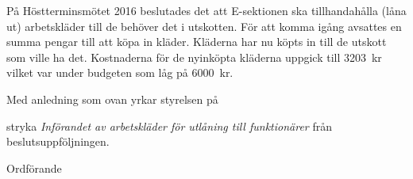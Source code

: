 \documentclass[../_main/handlingar.tex]{subfiles}
\begin{document}

På Höstterminsmötet 2016 beslutades det att E-sektionen ska tillhandahålla (låna ut) arbetskläder till de behöver det i utskotten. För att komma igång avsattes en summa pengar till att köpa in kläder. Kläderna har nu köpts in till de utskott som ville ha det. Kostnaderna för de nyinköpta kläderna uppgick till \SI{3203}{kr} vilket var under budgeten som låg på \SI{6000}{kr}.

Med anledning som ovan yrkar styrelsen på

\begin{attsatser}
    \att stryka \emph{Införandet av arbetskläder för utlåning till funktionärer} från beslutsuppföljningen.
\end{attsatser}

\begin{signatures}{1}
    \ist
    \signature{\ordf}{Ordförande}
\end{signatures}
\end{document}
